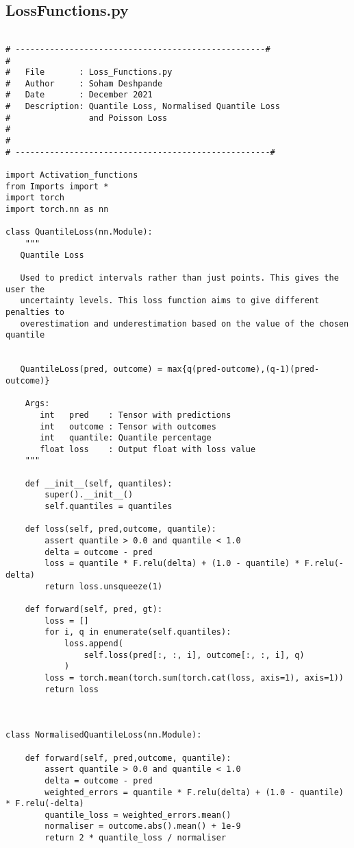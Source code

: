 \documentclass{article}
\begin{document}
\subsection{LossFunctions.py}
\begin{lstlisting}

# ---------------------------------------------------#
#
#   File       : Loss_Functions.py
#   Author     : Soham Deshpande
#   Date       : December 2021
#   Description: Quantile Loss, Normalised Quantile Loss
#                and Poisson Loss
#
#
# ----------------------------------------------------#

import Activation_functions
from Imports import *
import torch
import torch.nn as nn

class QuantileLoss(nn.Module):
    """
   Quantile Loss

   Used to predict intervals rather than just points. This gives the user the
   uncertainty levels. This loss function aims to give different penalties to
   overestimation and underestimation based on the value of the chosen quantile


   QuantileLoss(pred, outcome) = max{q(pred-outcome),(q-1)(pred-outcome)}

    Args:
       int   pred    : Tensor with predictions
       int   outcome : Tensor with outcomes
       int   quantile: Quantile percentage
       float loss    : Output float with loss value
    """

    def __init__(self, quantiles):
        super().__init__()
        self.quantiles = quantiles

    def loss(self, pred,outcome, quantile):
        assert quantile > 0.0 and quantile < 1.0
        delta = outcome - pred
        loss = quantile * F.relu(delta) + (1.0 - quantile) * F.relu(-delta)
        return loss.unsqueeze(1)

    def forward(self, pred, gt):
        loss = []
        for i, q in enumerate(self.quantiles):
            loss.append(
                self.loss(pred[:, :, i], outcome[:, :, i], q)
            )
        loss = torch.mean(torch.sum(torch.cat(loss, axis=1), axis=1))
        return loss



class NormalisedQuantileLoss(nn.Module):

    def forward(self, pred,outcome, quantile):
        assert quantile > 0.0 and quantile < 1.0
        delta = outcome - pred
        weighted_errors = quantile * F.relu(delta) + (1.0 - quantile) * F.relu(-delta)
        quantile_loss = weighted_errors.mean()
        normaliser = outcome.abs().mean() + 1e-9
        return 2 * quantile_loss / normaliser





\end{lstlisting}
\end{document}
